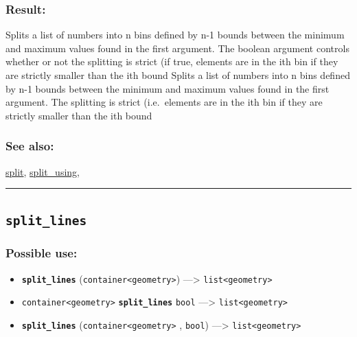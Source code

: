 \documentclass[]{book}
\providecommand{\tightlist}{%
  \setlength{\itemsep}{0pt}\setlength{\parskip}{0pt}}
\theoremstyle{definition}
\theoremstyle{definition}
\theoremstyle{definition}
\theoremstyle{remark}
\begin{document}
\subsubsection{Result:}\label{result-478}

Splits a list of numbers into n bins defined by n-1 bounds between the
minimum and maximum values found in the first argument. The boolean
argument controls whether or not the splitting is strict (if true,
elements are in the ith bin if they are strictly smaller than the ith
bound Splits a list of numbers into n bins defined by n-1 bounds between
the minimum and maximum values found in the first argument. The
splitting is strict (i.e.~elements are in the ith bin if they are
strictly smaller than the ith bound

\subsubsection{See also:}\label{see-also-193}

\href{operators-s-to-z.html\#split}{split},
\href{operators-s-to-z.html\#split_using}{split\_using},

\begin{center}\rule{0.5\linewidth}{\linethickness}\end{center}

\subsection{\texorpdfstring{\texttt{split\_lines}}{split\_lines}}\label{split_lines}

\subsubsection{Possible use:}\label{possible-use-495}

\begin{itemize}
\tightlist
\item
  \textbf{\texttt{split\_lines}}
  (\texttt{container\textless{}geometry\textgreater{}})
  ---\textgreater{} \texttt{list\textless{}geometry\textgreater{}}
\item
  \texttt{container\textless{}geometry\textgreater{}}
  \textbf{\texttt{split\_lines}} \texttt{bool} ---\textgreater{}
  \texttt{list\textless{}geometry\textgreater{}}
\item
  \textbf{\texttt{split\_lines}}
  (\texttt{container\textless{}geometry\textgreater{}} , \texttt{bool})
  ---\textgreater{} \texttt{list\textless{}geometry\textgreater{}}
\end{itemize}
\end{document}
